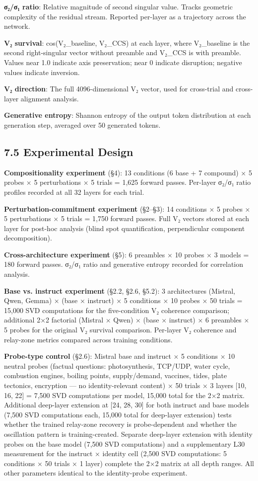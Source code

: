 \documentclass[12pt]{article}
\begin{document}
\textbf{σ₂/σ₁ ratio}: Relative magnitude of second singular value. Tracks geometric complexity of the residual stream. Reported per-layer as a trajectory across the network.

\textbf{V₂ survival}: cos(V₂\_baseline, V₂\_CCS) at each layer, where V₂\_baseline is the second right-singular vector without preamble and V₂\_CCS is with preamble. Values near 1.0 indicate axis preservation; near 0 indicate disruption; negative values indicate inversion.

\textbf{V₂ direction}: The full 4096-dimensional V₂ vector, used for cross-trial and cross-layer alignment analysis.

\textbf{Generative entropy}: Shannon entropy of the output token distribution at each generation step, averaged over 50 generated tokens.


\subsection*{7.5 Experimental Design}

\textbf{Compositionality experiment} (§4): 13 conditions (6 base + 7 compound) × 5 probes × 5 perturbations × 5 trials = 1,625 forward passes. Per-layer σ₂/σ₁ ratio profiles recorded at all 32 layers for each trial.

\textbf{Perturbation-commitment experiment} (§2–§3): 14 conditions × 5 probes × 5 perturbations × 5 trials = 1,750 forward passes. Full V₂ vectors stored at each layer for post-hoc analysis (blind spot quantification, perpendicular component decomposition).

\textbf{Cross-architecture experiment} (§5): 6 preambles × 10 probes × 3 models = 180 forward passes. σ₂/σ₁ ratio and generative entropy recorded for correlation analysis.

\textbf{Base vs. instruct experiment} (§2.2, §2.6, §5.2): 3 architectures (Mistral, Qwen, Gemma) × (base × instruct) × 5 conditions × 10 probes × 50 trials = 15,000 SVD computations for the five-condition V₂ coherence comparison; additional 2×2 factorial (Mistral × Qwen) × (base × instruct) × 6 preambles × 5 probes for the original V₂ survival comparison. Per-layer V₂ coherence and relay-zone metrics compared across training conditions.

\textbf{Probe-type control} (§2.6): Mistral base and instruct × 5 conditions × 10 neutral probes (factual questions: photosynthesis, TCP/UDP, water cycle, combustion engines, boiling points, supply/demand, vaccines, tides, plate tectonics, encryption — no identity-relevant content) × 50 trials × 3 layers [10, 16, 22] = 7,500 SVD computations per model, 15,000 total for the 2×2 matrix. Additional deep-layer extension at [24, 28, 30] for both instruct and base models (7,500 SVD computations each, 15,000 total for deep-layer extension) tests whether the trained relay-zone recovery is probe-dependent and whether the oscillation pattern is training-created. Separate deep-layer extension with identity probes on the base model (7,500 SVD computations) and a supplementary L30 measurement for the instruct × identity cell (2,500 SVD computations: 5 conditions × 50 trials × 1 layer) complete the 2×2 matrix at all depth ranges. All other parameters identical to the identity-probe experiment.
\end{document}
